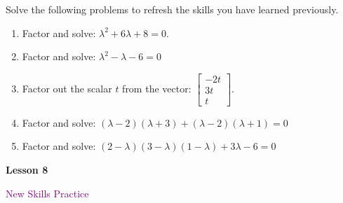 \documentclass[10pt]{book}
\theoremstyle{definition}
\theoremstyle{remark}
\begin{document}
\begin{large}
\noindent
Solve the following problems to refresh the skills you have learned previously.
\begin{enumerate}
\item Factor and solve: $\lambda^{2} + 6\lambda + 8=0$.\vfil \vfil \vfil
\item Factor and solve: $\lambda^{2} - \lambda - 6=0$ \vfil \vfil \vfil
\item Factor out the scalar $t$ from the vector: $\begin{bmatrix} -2t \\ 3t \\ t \end{bmatrix}$.\vfil \vfil \vfil
\item Factor and solve: $(\lambda - 2)(\lambda + 3) + (\lambda - 2)(\lambda + 1)=0$\vfil \vfil\vfil
\item Factor and solve: $(2-\lambda)(3-\lambda)(1-\lambda) + 3\lambda - 6 = 0$ \vfil \vfil \vfil
\end{enumerate}
\end{large}
\newpage


\begin{tcolorbox}[
  width=\textwidth,
  colback=gray!10, %
  colframe=white, %
  boxrule=0pt,    %
  left=1cm,       %
  right=1cm,      %
  sharp corners  %
]

\begin{minipage}[t]{0.5\textwidth}
  \Huge \textbf{Lesson 8}
\end{minipage}%
\hfill
\begin{minipage}[t]{0.5\textwidth}
  \Huge\textcolor{purple}{New Skills Practice}
\end{minipage}
\end{tcolorbox}
\end{document}
